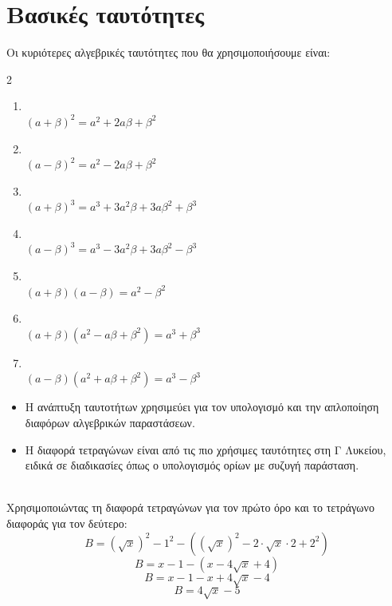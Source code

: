 \section{Βασικές ταυτότητες}

Οι κυριότερες αλγεβρικές ταυτότητες που θα χρησιμοποιήσουμε είναι:
\begin{multicols}{2}
\begin{enumerate}[label=\arabic*.]
\item {}\\ $(a+\beta)^2=a^2+2a\beta+\beta^2$
\item {}\\ $(a-\beta)^2=a^2-2a\beta+\beta^2$
\item {}\\ $(a+\beta)^3=a^3+3a^2\beta+3a\beta^2+\beta^3$
\item {}\\ $(a-\beta)^3=a^3-3a^2\beta+3a\beta^2-\beta^3$
\item {}\\ $(a+\beta)(a-\beta)=a^2-\beta^2$
\item {}\\ $(a+\beta)(a^2-a\beta+\beta^2)=a^3+\beta^3$
\item {}\\ $(a-\beta)(a^2+a\beta+\beta^2)=a^3-\beta^3$
\end{enumerate}
\end{multicols}

\begin{itemize}
    \item Η ανάπτυξη ταυτοτήτων χρησιμεύει για τον υπολογισμό και την απλοποίηση διαφόρων αλγεβρικών παραστάσεων.
    \item Η διαφορά τετραγώνων είναι από τις πιο χρήσιμες ταυτότητες στη Γ Λυκείου, ειδικά σε διαδικασίες όπως ο υπολογισμός ορίων με συζυγή παράσταση.
\end{itemize}


\\
\lysh
Χρησιμοποιώντας τη διαφορά τετραγώνων για τον πρώτο όρο και το τετράγωνο διαφοράς για τον δεύτερο:
\[ B = (\sqrt{x})^2 - 1^2 - \left( (\sqrt{x})^2 - 2\cdot\sqrt{x}\cdot 2 + 2^2 \right) \]
\[ B = x - 1 - (x - 4\sqrt{x} + 4) \]
\[ B = x - 1 - x + 4\sqrt{x} - 4 \]
\[ B = 4\sqrt{x} - 5 \]


